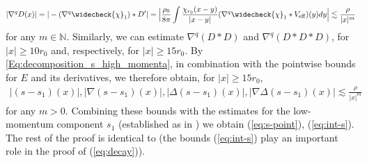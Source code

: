 \documentclass[a4paper,11pt]{article}
\def\bN{\mathbb{N}}
\numberwithin{equation}{section}
\begin{document}
    \begin{align*}
       | \nabla^{q} D(x) | = | -\left(\nabla^q \widecheck{\chi}_{1}\right)*D' | = \Big| \frac{\rho_0}{8\pi}\int  \frac{\chi_{r_0}(x-y)}{|x-y|}(\nabla^q \widecheck{\chi}_{1} * V_\mathrm{eff})(y) dy \Big| \lesssim \frac{\rho}{|x|^m}
    \end{align*}
for any $m \in \bN$. Similarly, we can estimate $\nabla^q (D*D)$ and $\nabla^q (D*D*D)$, for $|x|\geq 10r_0$ and, respectively, for $|x|\geq 15r_0$. By \eqref{Eq:decomposition_s_high_momenta}, in combination with the pointwise bounds for $E$ and its derivatives, we therefore obtain, for $|x|\geq 15r_0$, 
    \begin{align*}
        \left|(s-s_1)(x)\right|, \left|\nabla (s-s_1)(x)\right|, \left|\Delta(s-s_1)(x)\right|, \left|\nabla \Delta (s-s_1)(x)\right|\lesssim \frac{\rho}{|x|^{m}} 
    \end{align*}
for any $m > 0$. Combining these bounds with the estimates for the low-momentum component $s_1$ (established as in \cite{BBCOS}) we obtain (\ref{eq:s-point}), (\ref{eq:int-s}). The rest of the proof is identical to \cite[Lemma 2.2]{BBCOS} (the bounds (\ref{eq:int-s}) play an important role in the proof of (\ref{eq:decay})). 
\end{document}
